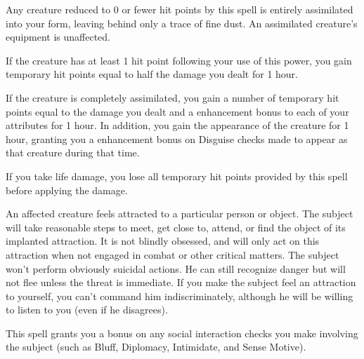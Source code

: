 \spellrng{\rngtouch}
\par Any creature reduced to 0 or fewer hit points by this spell is entirely assimilated into your form, leaving behind only a trace of fine dust. An assimilated creature's equipment is unaffected.
\par If the creature has at least 1 hit point following your use of this power, you gain temporary hit points equal to half the damage you dealt for 1 hour.
\par If the creature is completely assimilated, you gain a number of temporary hit points equal to the damage you dealt and a  enhancement bonus to each of your attributes for 1 hour. In addition, you gain the appearance of the creature for 1 hour, granting you a  enhancement bonus on Disguise checks made to appear as that creature during that time.

If you take life damage, you lose all temporary hit points provided by this spell before applying the damage.

\spellrng{\rngmed}
\spelldur{\durext}
\begin{spelleffect}
  An affected creature feels attracted to a particular person or object. The subject will take reasonable steps to meet, get close to, attend, or find the object of its implanted attraction. It is not blindly obsessed, and will only act on this attraction when not engaged in combat or other critical matters. The subject won't perform obviously suicidal actions. He can still recognize danger but will not flee unless the threat is immediate. If you make the subject feel an attraction to yourself, you can't command him indiscriminately, although he will be willing to listen to you (even if he disagrees).
  \par This spell grants you a  bonus on any social interaction checks you make involving the subject (such as Bluff, Diplomacy, Intimidate, and Sense Motive).
\end{spelleffect}

